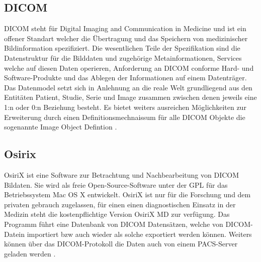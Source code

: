 \subsection{DICOM}
\label{sec:DICOM}
DICOM steht für Digital Imaging and Communication in Medicine und ist ein offener Standart welcher die Übertragung und das Speichern von medizinischer Bildinformation spezifiziert.
Die wesentlichen Teile der Spezifikation sind die Datenstruktur für die Bilddaten und zugehörige Metainformationen, 
Services welche auf diesen Daten operieren, Anforderung an DICOM conforme Hard- und Software-Produkte und das Ablegen der Informationen auf einem Datenträger.
Das Datenmodel setzt sich in Anlehnung an die reale Welt grundliegend aus den Entitäten Patient, Studie, Serie und Image zusammen zwischen denen jeweils eine 1:n oder 0:n Beziehung besteht.
Es bietet weiters ausreichen Möglichkeiten zur Erweiterung durch einen Definitionsmechnaissum für alle DICOM Objekte die sogenannte Image Object Defintion \cite{pacs}.

\subsection{Osirix}
\label{sec:Osirix}
OsiriX ist eine Software zur Betrachtung und Nachbearbeitung von DICOM Bildaten.
Sie wird als freie Open-Source-Software unter der GPL für das Betriebssystem Mac OS X entwickelt.
OsiriX ist nur für die Forschung und dem privaten gebrauch zugelassen, 
für einen einen diagnostischen Einsatz in der Medizin steht die kostenpflichtige Version OsiriX MD zur verfügung.
%
Das Programm führt eine Datenbank von DICOM Datensätzen, 
welche von DICOM-Datein importiert bzw auch wieder als solche exportiert werden können.
Weiters können über das DICOM-Protokoll die Daten auch von einem PACS-Server geladen werden \cite{osirix}.

